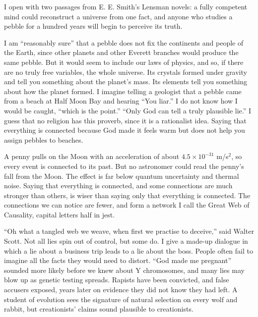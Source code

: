 
I open with two passages from E. E. Smith's Lensman novels: a fully competent mind could reconstruct a universe from one fact, and anyone who studies a pebble for a hundred years will begin to perceive its truth. 

I am ``reasonably sure'' that a pebble does not fix the continents and people of the Earth, since other planets and other Everett branches would produce the same pebble. But it would seem to include our laws of physics, and so, if there are no truly free variables, the whole universe.  Its crystals formed under gravity and tell you something about the planet's mass. Its elements tell you something about how the planet formed.  I imagine telling a geologist that a pebble came from a beach at Half Moon Bay and hearing ``You liar.'' I do not know how I would be caught, ``which is the point.'' ``Only God can tell a truly plausible lie.'' I guess that no religion has this proverb, since it is a rationalist idea. Saying that everything is connected because God made it feels warm but does not help you assign pebbles to beaches.

A penny pulls on the Moon with an acceleration of about $4.5 \times 10^{-31}$ m/s$^2$, so every event is connected to its past. But no astronomer could read the penny's fall from the Moon. The effect is far below quantum uncertainty and thermal noise. Saying that everything is connected, and some connections are much stronger than others, is wiser than saying only that everything is connected.  The connections we can notice are fewer, and form a network I call the Great Web of Causality, capital letters half in jest.

``Oh what a tangled web we weave, when first we practise to deceive,'' said Walter Scott. Not all lies spin out of control, but some do. I give a made-up dialogue in which a lie about a business trip leads to a lie about the boss. People often fail to imagine all the facts they would need to distort. ``God made me pregnant'' sounded more likely before we knew about Y chromosomes, and many lies may blow up as genetic testing spreads. Rapists have been convicted, and false accusers exposed, years later on evidence they did not know they had left. A student of evolution sees the signature of natural selection on every wolf and rabbit, but creationists' claims sound plausible to creationists.


